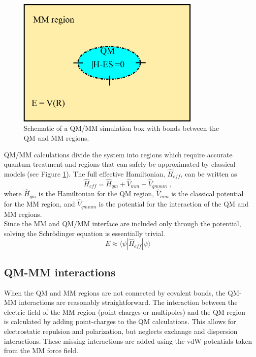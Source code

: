 \documentclass[12pt]{report}
\begin{document}
\begin{figure}[hbt]
 \centering
 \includegraphics[width=0.8\textwidth]{../doc/images/QMMM_1.png}
 \caption{
 Schematic of a QM/MM simulation box with bonds between the QM and MM
 regions.}
 \label{fig:QMMM1}
\end{figure}

QM/MM calculations divide the system into regions which require accurate
quantum treatment and regions that can safely be approximated by classical
models (see Figure \ref{fig:QMMM1}).
The full effective Hamiltonian,
$\hat H_{eff}$, can be written as
\begin{equation}
 \hat H_{eff} = \hat H_{qm} + \hat V_{mm} + \hat V_{qmmm} \; ,
\end{equation}
where $\hat H_{qm}$ is the Hamiltonian for the QM region, $\hat V_{mm}$
is the classical potential for the MM region, and $\hat V_{qmmm}$ is the
potential for the interaction of the QM and MM regions. \\

Since the MM and QM/MM interface are included only through the potential,
solving the Schr\"odinger equation is essentially trivial.
\begin{equation}
 E \approx \langle \psi |\hat H_{eff}|\psi \rangle
\end{equation}

\subsection{QM-MM interactions}

When the QM and MM regions are not connected by covalent bonds, the QM-MM
interactions are reasonably straightforward.
The interaction between the electric field of the MM region (point-charges or
multipoles) and the QM region is calculated by adding point-charges to the QM
calculations.
This allows for electrostatic repulsion and polarization, but neglects
exchange and dispersion interactions.
These missing interactions are added using the vdW potentials taken from the
MM force field. \\
\end{document}
